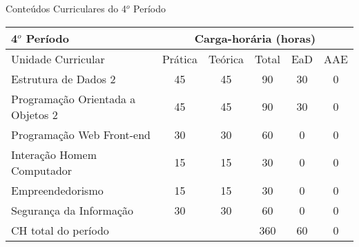 \begin{quadro}[ht!]
\centering
\caption{Conteúdos Curriculares do 4$^o$ Período}\label{qua:periodo4}
\begin{tabular}{|p{8.0cm}|c|c|c|c|c|}
\hline
\rowcolor{blue1} 4$^o$ Período & \multicolumn{5}{|c|}{\centering Carga-horária (horas)} \\ \hline
\rowcolor{blue1} Unidade Curricular & Prática & Teórica & Total & EaD & AAE \\ \hline
Estrutura de Dados 2 & 45 & 45 & 90 & 30	&	0 \\	\hline
Programação Orientada a Objetos 2 & 45 & 45 & 90 & 30	&	0 \\	\hline
Programação Web Front-end & 30 & 30 & 60 & 0	&	0 \\	\hline
Interação Homem Computador & 15 & 15 & 30 & 0	&	0 \\	\hline
Empreendedorismo & 15 & 15 & 30 & 0	&	0 \\	\hline
Segurança da Informação & 30 & 30 & 60 & 0	&	0 \\	\hline
CH total do período & \multicolumn{2}{p{3.3cm}|}{\cellcolor{blue1}} & 360 & 60	&	0 \\ \hline
\end{tabular} \end{quadro}